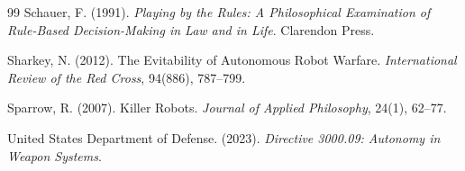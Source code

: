 \documentclass[11pt]{article}
\begin{document}
\begin{thebibliography}{99}
Schauer, F. (1991). \textit{Playing by the Rules: A Philosophical Examination of Rule-Based Decision-Making in Law and in Life}. Clarendon Press.

Sharkey, N. (2012). The Evitability of Autonomous Robot Warfare. \textit{International Review of the Red Cross}, 94(886), 787--799.

Sparrow, R. (2007). Killer Robots. \textit{Journal of Applied Philosophy}, 24(1), 62--77.

United States Department of Defense. (2023). \textit{Directive 3000.09: Autonomy in Weapon Systems}.

\end{thebibliography}
\end{document}
